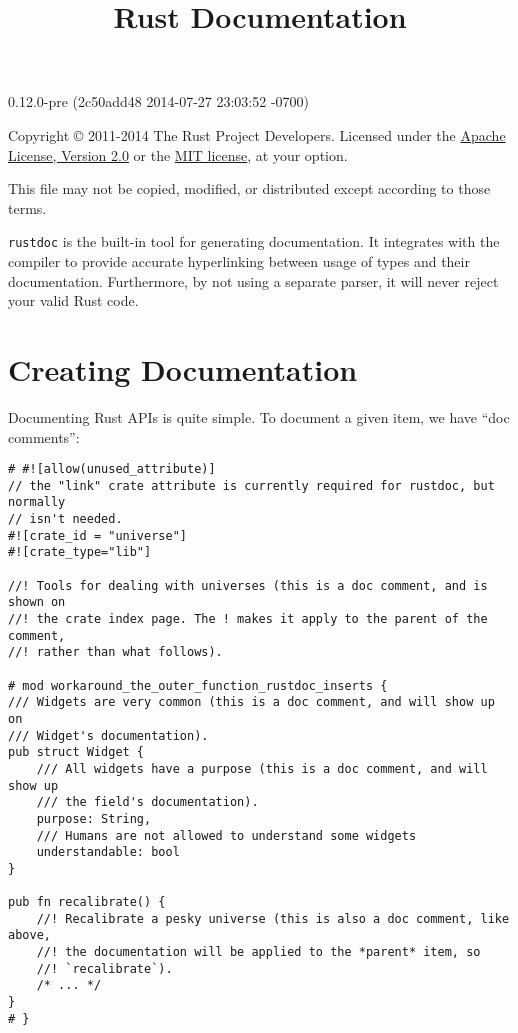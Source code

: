 \documentclass[]{article}
\title{Rust Documentation}
\begin{document}
\maketitle

0.12.0-pre (2c50add48 2014-07-27 23:03:52 -0700)

Copyright © 2011-2014 The Rust Project Developers. Licensed under the
\href{http://www.apache.org/licenses/LICENSE-2.0}{Apache License,
Version 2.0} or the \href{http://opensource.org/licenses/MIT}{MIT
license}, at your option.

This file may not be copied, modified, or distributed except according
to those terms.

{
\hypersetup{linkcolor=black}
\setcounter{tocdepth}{3}
\tableofcontents
}
\texttt{rustdoc} is the built-in tool for generating documentation. It
integrates with the compiler to provide accurate hyperlinking between
usage of types and their documentation. Furthermore, by not using a
separate parser, it will never reject your valid Rust code.

\section{Creating Documentation}\label{creating-documentation}

Documenting Rust APIs is quite simple. To document a given item, we have
``doc comments'':

\begin{verbatim}
# #![allow(unused_attribute)]
// the "link" crate attribute is currently required for rustdoc, but normally
// isn't needed.
#![crate_id = "universe"]
#![crate_type="lib"]

//! Tools for dealing with universes (this is a doc comment, and is shown on
//! the crate index page. The ! makes it apply to the parent of the comment,
//! rather than what follows).

# mod workaround_the_outer_function_rustdoc_inserts {
/// Widgets are very common (this is a doc comment, and will show up on
/// Widget's documentation).
pub struct Widget {
    /// All widgets have a purpose (this is a doc comment, and will show up
    /// the field's documentation).
    purpose: String,
    /// Humans are not allowed to understand some widgets
    understandable: bool
}

pub fn recalibrate() {
    //! Recalibrate a pesky universe (this is also a doc comment, like above,
    //! the documentation will be applied to the *parent* item, so
    //! `recalibrate`).
    /* ... */
}
# }
\end{verbatim}
\end{document}

